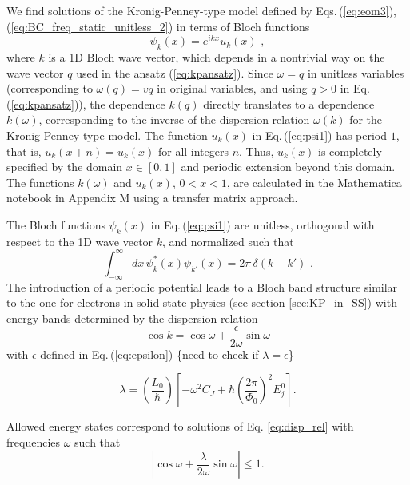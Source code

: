 We find solutions of the Kronig-Penney-type model defined by 
Eqs.\,(\ref{eq:eom3}), (\ref{eq:BC_freq_static_unitless_2})
in terms of Bloch functions
%
\begin{equation} \label{eq:psi1}
\psi_k(x) = e^{i k x} u_k(x) \, \, ,   
\end{equation}
%
where $k$ is a 1D Bloch wave vector, which depends in a nontrivial way on the wave vector 
$q$ used in the ansatz (\ref{eq:kpansatz}). Since
$\omega = q$ in unitless variables (corresponding to $\omega(q) = v q$ in original variables,
and using $q>0$ in Eq.\,(\ref{eq:kpansatz})),
the dependence $k(q)$ directly translates to a dependence $k(\omega)$, corresponding to the 
inverse of the dispersion relation $\omega(k)$ for the Kronig-Penney-type model.
The function $u_k(x)$ in Eq.\,(\ref{eq:psi1}) has period $1$, that is, $u_k(x + n) = u_k(x)$ 
for all integers $n$.
Thus, $u_k(x)$ is completely specified by the domain $x \in [0,1]$ and periodic extension
beyond this domain. 
The functions $k(\omega)$ and $u_k(x)$, $0 < x < 1$, are calculated in the 
\color{red}
Mathematica notebook in Appendix M
\color{black}
using a transfer matrix approach. 






The Bloch functions $\psi_k(x)$ in Eq.\,(\ref{eq:psi1}) are unitless, orthogonal with respect to 
the 1D wave vector $k$, and normalized such that
%
\begin{equation} \label{eq:psi1_norm_orig}
\int_{-\infty}^{\infty} dx \, \psi^*_k(x) \psi_{k'}(x) = 2 \pi \, \delta(k - k') \, \, .
\end{equation}
%
The introduction of a periodic potential leads to a Bloch band structure similar to the one for electrons in 
solid state physics (see section \ref{sec:KP_in_SS}) with energy bands determined by the dispersion relation
\begin{equation}\label{eq:disp_rel}
    \cos{k} = \cos{\omega} + \frac{\epsilon}{2\omega}\sin{\omega}
\end{equation}
%
with $\epsilon$ defined in Eq.\,(\ref{eq:epsilon}) 
\color{red}
\{need to check if $\lambda = \epsilon$\}
\color{black}


\begin{equation}\label{eq:lambda}
\lambda = \left(\frac{L_0}{\hbar}\right)  
\left[-\omega^2 C_{J}+\hbar\left(\frac{2 \pi}{\Phi_{0}}\right)^{2} E_{j}^0\right].
\end{equation}
%

Allowed energy states correspond to solutions of Eq. \ref{eq:disp_rel} with frequencies $\omega$ such that
%
\begin{equation}\label{eq:bands_condition}
    \left|\cos{\omega} + \frac{\lambda}{2\omega}\sin{\omega}\right|\leq 1.
\end{equation}


